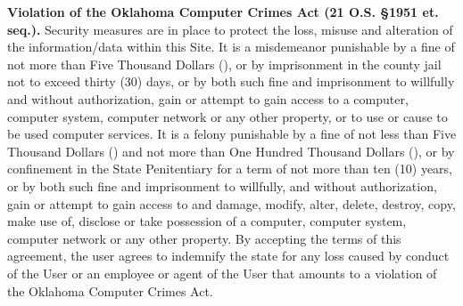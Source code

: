 \textbf{Violation of the Oklahoma Computer Crimes Act (21 O.S. \S1951 et. seq.).}
Security measures are in place to protect the loss, misuse and alteration of the
information/data within this Site. It is a misdemeanor punishable by a fine of
not more than Five Thousand Dollars (), or by imprisonment in the
county jail not to exceed thirty (30) days, or by both such fine and
imprisonment to willfully and without authorization, gain or attempt to gain
access to a computer, computer system, computer network or any other property,
or to use or cause to be used computer services. It is a felony punishable by a
fine of not less than Five Thousand Dollars () and not more than One
Hundred Thousand Dollars (), or by confinement in the State
Penitentiary for a term of not more than ten (10) years, or by both such fine
and imprisonment to willfully, and without authorization, gain or attempt to
gain access to and damage, modify, alter, delete, destroy, copy, make use of,
disclose or take possession of a computer, computer system, computer network or
any other property. By accepting the terms of this agreement, the user agrees to
indemnify the state for any loss caused by conduct of the User or an employee or
agent of the User that amounts to a violation of the Oklahoma Computer Crimes
Act.